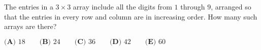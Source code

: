 The entries in a $ 3\times3$ array include all the digits from $1$ through $9$, arranged so that the entries in every row and column are in increasing order. How many such arrays are there?

$\textbf{(A) }18\qquad\textbf{(B) }24\qquad\textbf{(C) }36\qquad\textbf{(D) }42\qquad\textbf{(E) }60$